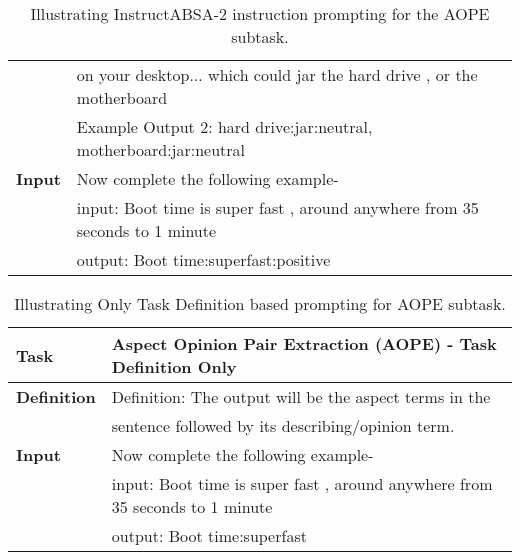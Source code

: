 \documentclass[11pt]{article}
\newcommand{\name}{\textsc{I}nstruct\textsc{ABSA}\xspace}
\begin{document}
\begin{table*}[]
{\begin{tabular}{ll}
\textbf{}           &  on your desktop... which could jar the hard drive , or the motherboard     \\ 
\textbf{}           & Example Output 2: hard drive:jar:neutral, motherboard:jar:neutral                    \\ 
\hline 
\textbf{Input}      & Now complete the following example-                                \\
\textbf{}           & input: Boot time is super fast , around anywhere from 35 seconds to 1 minute \\
                    & output: Boot time:superfast:positive\\ \hline
\end{tabular}
}
\caption{
     Illustrating \name{}-2 instruction prompting for the AOPE subtask.}
\label{tab:aoste_ip}
\end{table*} 
\begin{table*}[]
\resizebox{\linewidth}{!}
{
\begin{tabular}{ll}
\hline
\textbf{Task} & Aspect Opinion Pair Extraction (AOPE) - Task Definition Only \\ 
\hline                                                  
\textbf{Definition} & Definition: The output will be the aspect terms in the \\
& sentence followed by its describing/opinion term.\\ 
\hline                                          
\textbf{Input}      & Now complete the following example-                                \\
\textbf{}           & input: Boot time is super fast , around anywhere from 35 seconds to 1 minute \\
                    & output: Boot time:superfast\\ \hline
\end{tabular}
}
\caption{
     Illustrating Only Task Definition based prompting for AOPE subtask.}
\label{tab:task_def_aope}
\end{table*} 
\end{document}
